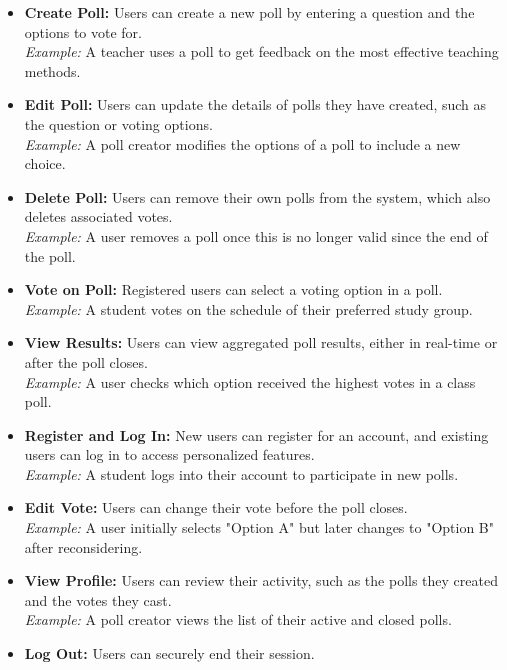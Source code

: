 \begin{itemize}
    \item \textbf{Create Poll:} Users can create a new poll by entering a question and the options to vote for.\\
    \textit{Example:} A teacher uses a poll to get feedback on the most effective teaching methods.
    
    \item \textbf{Edit Poll:} Users can update the details of polls they have created, such as the question or voting options.\\
    \textit{Example:} A poll creator modifies the options of a poll to include a new choice.
    
    \item \textbf{Delete Poll:} Users can remove their own polls from the system, which also deletes associated votes.\\
    \textit{Example:} A user removes a poll once this is no longer valid since the end of the poll.
    
    \item \textbf{Vote on Poll:} Registered users can select a voting option in a poll.\\
    \textit{Example:} A student votes on the schedule of their preferred study group.
    
    \item \textbf{View Results:} Users can view aggregated poll results, either in real-time or after the poll closes.\\
    \textit{Example:} A user checks which option received the highest votes in a class poll.
    
    \item \textbf{Register and Log In:} New users can register for an account, and existing users can log in to access personalized features.\\
    \textit{Example:} A student logs into their account to participate in new polls.
    
    \item \textbf{Edit Vote:} Users can change their vote before the poll closes.\\
    \textit{Example:} A user initially selects "Option A" but later changes to "Option B" after reconsidering.
    
    \item \textbf{View Profile:} Users can review their activity, such as the polls they created and the votes they cast.\\
    \textit{Example:} A poll creator views the list of their active and closed polls.
    
    \item \textbf{Log Out:} Users can securely end their session.
\end{itemize}


